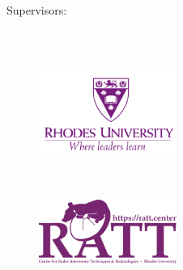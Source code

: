 \begin{titlepage}


    \begin{addmargin}[0cm]{0cm}
    \begin{center}
        \large

        \hfill

        \vfill

        \begingroup
            \color{CMtitle}\Huge\spacedallcaps{\myTitle} \\ \bigskip
        \endgroup

        \vspace{8mm}

        {\myName}

        \vspace{5mm}

        Supervisors: \\

        \vspace{3mm}
        
        \color{CMtitle}{\myProf} \\
        {\myOtherProf} \\

        \vspace{8mm}

        \begin{figure}[!htb]
          \centering
          \begin{minipage}{0.5\textwidth}
            \centering
            \includegraphics[width=4.5cm]{figures/title/rhodes-logo.png}
          \end{minipage}
          \vspace{1cm}\\
          \begin{minipage}{0.5\textwidth}
              \centering
              \includegraphics[width=4.5cm]{figures/title/ratt-logo.png}
            \end{minipage}
         \end{figure}


\end{center}
\end{addmargin}
\end{titlepage}
